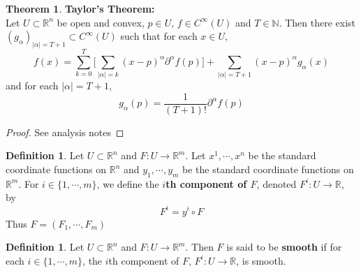 \documentclass[12pt]{amsart}
\theoremstyle{definition}
\newtheorem{defn}[definition]{Definition}
\newtheorem{thm}[definition]{Theorem}
\newcommand{\al}{\alpha}
\newcommand{\N}{\mathbb{N}}
\newcommand{\R}{\mathbb{R}}
\newcommand{\p}{\partial}
\begin{document}

	\begin{thm} \textbf{Taylor's Theorem:}\\ 
		Let $U \subset \R^n$ be open and convex, $p \in U$, $f \in C^{\infty}(U)$ and $T \in \N$. Then there exist $(g_{\al})_{|\al| = T+1} \subset C^{\infty}(U)$ such that for each $x \in U$, 
		$$f(x) = \sum_{k=0}^{T} \bigg[\sum_{|\al| = k}(x - p)^{\al} \p^{\al} f (p) \bigg] + \sum_{|\al| = T+1}(x - p)^{\al} g_{\al}(x)$$ and for each $|\al|= T+1$, $$g_{\al}(p) = \frac{1}{(T+1)!}\p^{\al} f(p)$$
	\end{thm}
	
	\begin{proof}
	See analysis notes
	\end{proof}


	\begin{defn}
	Let $U \subset \R^n$ and $F: U \rightarrow \R^m$. Let $x^1, \cdots, x^n$ be the standard coordinate functions on $\R^n$ and $y_1, \cdots, y_m$ be the standard coordinate functions on $\R^m$. For $i \in \{1, \cdots, m\}$, we define the \textbf{$i$th component of $F$}, denoted $F^i: U \rightarrow \R$, by $$F^i = y^i \circ F$$ 
	Thus $F = (F_1, \cdots, F_m)$
	\end{defn}
	
	\begin{defn}
	Let $U \subset \R^n$ and $F: U \rightarrow \R^m$. Then $F$ is said to be \textbf{smooth} if for each $i \in \{1, \cdots, m\}$, the $i$th component of $F$, $F^i: U \rightarrow \R$, is smooth.
	\end{defn}
\end{document}
